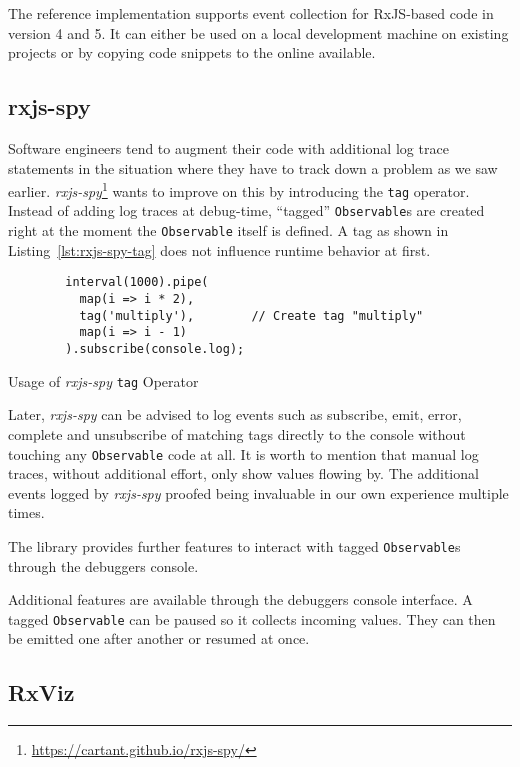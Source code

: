 \documentclass[12pt,a4paper]{article}
\begin{document}
The reference implementation supports event collection for RxJS-based code in version 4 and 5. It can either be used on a local development machine on existing projects or by copying code snippets to the online available.

\subsection{rxjs-spy}

Software engineers tend to augment their code with additional log trace statements in the situation where they have to track down a problem as we saw earlier. \emph{rxjs-spy}\footnote{\url{https://cartant.github.io/rxjs-spy/}} wants to improve on this by introducing the \texttt{tag} operator. Instead of adding log traces at debug-time, ``tagged'' \texttt{Observable}s are created right at the moment the \texttt{Observable} itself is defined. A tag as shown in Listing~\ref{lst:rxjs-spy-tag} does not influence runtime behavior at first.

\begin{listing}[H]
	\begin{verbatim}
		interval(1000).pipe(
		  map(i => i * 2),
		  tag('multiply'),        // Create tag "multiply"
		  map(i => i - 1)
		).subscribe(console.log);
	\end{verbatim}
	\caption{Usage of \emph{rxjs-spy} \texttt{tag} Operator}
	\label{lst:rxjs-spy-tag}
\end{listing}

Later, \emph{rxjs-spy} can be advised to log events such as subscribe, emit, error, complete and unsubscribe of matching tags directly to the console without touching any \texttt{Observable} code at all. It is worth to mention that manual log traces, without additional effort, only show values flowing by. The additional events logged by \emph{rxjs-spy} proofed being invaluable in our own experience multiple times.

The library provides further features to interact with tagged \texttt{Observable}s through the debuggers console.

Additional features are available through the debuggers console interface. A tagged \texttt{Observable} can be paused so it collects incoming values. They can then be emitted one after another or resumed at once.

\subsection{RxViz}
\end{document}
